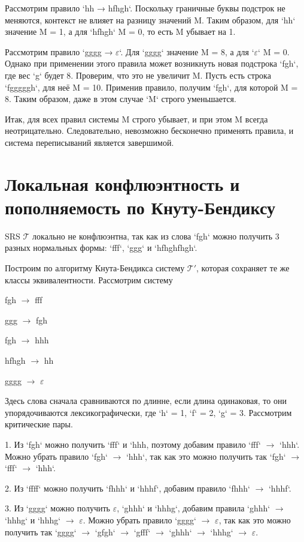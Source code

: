 \documentclass[a4paper, 14pt]{extarticle}
\begin{document}
Рассмотрим правило `hh → hfhgh`. Поскольку граничные буквы подстрок не меняются, контекст не влияет на разницу значений M. Таким образом, для `hh` значение M = 1, а для `hfhgh` M = 0, то есть M убывает на 1.

Рассмотрим правило `gggg → $\varepsilon$`. Для `gggg` значение M = 8, а для `$\varepsilon$` M = 0. Однако при применении этого правила может возникнуть новая подстрока `fgh`, где вес `g` будет 8. Проверим, что это не увеличит M. Пусть есть строка `fgggggh`, для неё M = 10. Применив правило, получим `fgh`, для которой M = 8. Таким образом, даже в этом случае `M` строго уменьшается.

Итак, для всех правил системы M строго убывает, и при этом M всегда неотрицательно. Следовательно, невозможно бесконечно применять правила, и система переписываний является завершимой.

\section{Локальная конфлюэнтность и пополняемость по Кнуту-Бендиксу}
SRS $\mathcal{T}$ локально не конфлюэнтна, так как из слова `fgh` можно получить 3 разных нормальных формы: `fff`, `ggg` и `hfhghfhgh`. 

Построим по алгоритму Кнута-Бендикса систему $\mathcal{T}'$, которая сохраняет те же классы эквивалентности. Рассмотрим систему 

fgh $\rightarrow$ fff

ggg $\rightarrow$ fgh

fgh $\rightarrow$ hhh

hfhgh $\rightarrow$ hh

gggg $\rightarrow$ $\varepsilon$

Здесь слова сначала сравниваются по длинне, если длина одинаковая, то они упорядочиваются лексикографически, где `h` = 1, `f` = 2, `g` = 3. Рассмотрим критические пары.

1. Из `fgh` можно получить `fff` и `hhh, поэтому добавим правило `fff` $\rightarrow$ `hhh`. Можно убрать правило `fgh` $\rightarrow$ `hhh`, так как это можно получить так `fgh` $\rightarrow$ `fff` $\rightarrow$ `hhh`.

2. Из `ffff` можно получить `fhhh` и `hhhf`, добавим правило `fhhh` $\rightarrow$ `hhhf`.

3. Из `gggg` можно получить $\varepsilon$, `ghhh` и `hhhg`, добавим правила `ghhh` $\rightarrow$ `hhhg` и `hhhg` $\rightarrow$ $\varepsilon$. Можно убрать правило `gggg` $\rightarrow$ $\varepsilon$, так как это можно получить так `gggg` $\rightarrow$ `gfgh` $\rightarrow$ `gfff` $\rightarrow$ `ghhh` $\rightarrow$ `hhhg` $\rightarrow$ $\varepsilon$.
\end{document}
